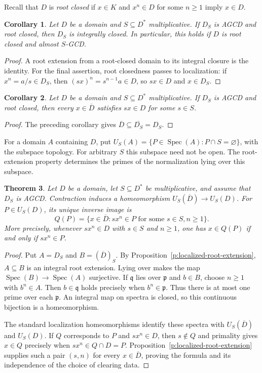 \documentclass[11pt]{amsart}
\newtheorem{theorem}{Theorem}[section]
\newtheorem{corollary}[theorem]{Corollary}
\theoremstyle{definition}
\theoremstyle{remark}
\DeclareMathOperator{\Spec}{Spec}
\begin{document}
Recall that $D$ is \emph{root closed} if $x\in K$ and $x^n\in D$
for some $n\geq1$ imply $x\in D$.

\begin{corollary}\label{c:root-closed-localization}
Let $D$ be a domain and $S\subseteq D^\ast$ multiplicative.
If $D_S$ is AGCD and root closed, then $D_S$ is integrally closed.
In particular, this holds if $D$ is root closed and almost $S$-GCD.
\end{corollary}
\begin{proof}
A root extension from a root-closed domain to its integral closure
is the identity. For the final assertion, root closedness passes
to localization: if $x^n=a/s\in D_S$, then
$(sx)^n=s^{n-1}a\in D$, so $sx\in D$ and $x\in D_S$.
\end{proof}

\begin{corollary}\label{c:integral-elements-cleared}
Let $D$ be a domain and $S\subseteq D^\ast$ multiplicative.
If $D_S$ is AGCD and root closed, then every $x\in\overline D$
satisfies $sx\in D$ for some $s\in S$.
\end{corollary}
\begin{proof}
The preceding corollary gives
$\overline D\subseteq\overline{D_S}=D_S$.
\end{proof}

For a domain $A$ containing $D$, put
$U_S(A)=\{P\in\Spec(A):P\cap S=\varnothing\}$, with the
subspace topology. For arbitrary $S$ this subspace need not be open.
The root-extension property determines the primes of the normalization
lying over this subspace.

\begin{theorem}\label{t:normalization-homeomorphism}
Let $D$ be a domain, let $S\subseteq D^\ast$ be multiplicative,
and assume that $D_S$ is AGCD. Contraction induces a homeomorphism
$U_S(\overline D)\longrightarrow U_S(D)$.
For $P\in U_S(D)$, its unique inverse image is
\[
 Q(P)=\{x\in\overline D:
 sx^n\in P\text{ for some }s\in S, n\geq1\}.
\]
More precisely, whenever $sx^n\in D$ with $s\in S$ and $n\geq1$,
one has $x\in Q(P)$ if and only if $sx^n\in P$.
\end{theorem}
\begin{proof}
Put $A=D_S$ and $B=(\overline D)_S$.
By Proposition~\ref{p:localized-root-extension}, $A\subseteq B$
is an integral root extension. Lying over makes the map
$\Spec(B)\longrightarrow\Spec(A)$ surjective. If $\mathfrak q$
lies over $\mathfrak p$ and $b\in B$, choose $n\geq1$ with
$b^n\in A$. Then $b\in\mathfrak q$ holds precisely when
$b^n\in\mathfrak p$. Thus there is at most one prime over each
$\mathfrak p$. An integral map on spectra is closed, so this
continuous bijection is a homeomorphism.

The standard localization homeomorphisms identify these spectra
with $U_S(\overline D)$ and $U_S(D)$. If $Q$ corresponds to $P$
and $sx^n\in D$, then $s\notin Q$ and primality gives
$x\in Q$ precisely when $sx^n\in Q\cap D=P$.
Proposition~\ref{p:localized-root-extension} supplies such a pair
$(s,n)$ for every $x\in\overline D$, proving the formula and
its independence of the choice of clearing data.
\end{proof}
\end{document}
